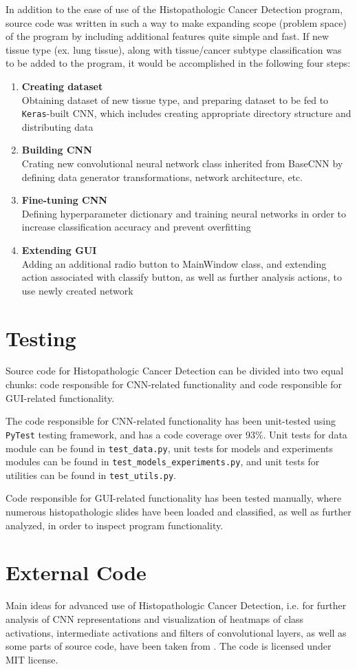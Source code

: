 In addition to the ease of use of the Histopathologic Cancer Detection program, source code was written in such a way to make expanding scope (problem space) of the program by including additional features quite simple and fast. If new tissue type (ex. lung tissue), along with tissue/cancer subtype classification was to be added to the program, it would be accomplished in the following four steps:
\begin{enumerate}
	\itemsep 0em
	\item \textbf{Creating dataset} \\
	Obtaining dataset of new tissue type, and preparing dataset to be fed to \texttt{Keras}-built CNN, which includes creating appropriate directory structure and distributing data
	\item \textbf{Building CNN} \\
	Crating new convolutional neural network class inherited from BaseCNN by defining data generator transformations, network architecture, etc.
	\item \textbf{Fine-tuning CNN} \\
	Defining hyperparameter dictionary and training neural networks in order to increase classification accuracy and prevent overfitting
	\item \textbf{Extending GUI} \\
	Adding an additional radio button to MainWindow class, and extending action associated with classify button, as well as further analysis actions, to use newly created network
\end{enumerate}

\section{Testing}
\label{tests}

Source code for Histopathologic Cancer Detection can be divided into two equal chunks: code responsible for CNN-related functionality and code responsible for GUI-related functionality.

The code responsible for CNN-related functionality has been unit-tested using \texttt{PyTest} testing framework, and has a code coverage over 93\%. Unit tests for data module can be found in \texttt{test\_data.py}, unit tests for models and experiments modules can be found in \texttt{test\_models\_experiments.py}, and unit tests for utilities can be found in \texttt{test\_utils.py}.

Code responsible for GUI-related functionality has been tested manually, where numerous histopathologic slides have been loaded and classified, as well as further analyzed, in order to inspect program functionality. 

\section{External Code}

Main ideas for advanced use of Histopathologic Cancer Detection, i.e. for further analysis of CNN representations and visualization of heatmaps of class activations, intermediate activations and filters of convolutional layers, as well as some parts of source code, have been taken from \cite{chollet2018deep}. The code is licensed under MIT license.
